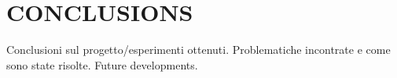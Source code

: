\documentclass[a4paper, 10 pt, conference]{ieeeconf}      %
\begin{document}
\section{CONCLUSIONS}

Conclusioni sul progetto/esperimenti ottenuti.
Problematiche incontrate e come sono state risolte.
Future developments.

\addtolength{\textheight}{-12cm}   %



\end{document}
